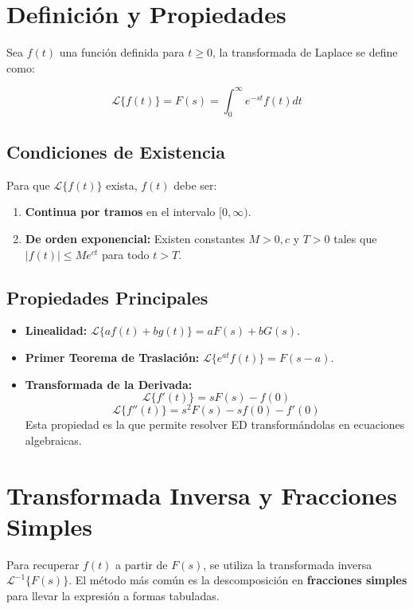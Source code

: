 \documentclass[a4paper,12pt]{article}
\begin{document}
 \section{Definición y Propiedades}
 Sea $f(t)$ una función definida para $t \geqslant 0$, la transformada de Laplace se define como:
 \begin{tcolorbox}[colback=red!5!white,colframe=red!75!black,title=Definición Integral]
 $$ \mathcal{L}\{f(t)\} = F(s) = \int_{0}^{\infty} e^{-st} f(t) dt $$
 \end{tcolorbox}

 \subsection{Condiciones de Existencia}
 Para que $\mathcal{L}\{f(t)\}$ exista, $f(t)$ debe ser:
 \begin{enumerate}
     \item \textbf{Continua por tramos} en el intervalo $[0, \infty)$.
     \item \textbf{De orden exponencial:} Existen constantes $M > 0, c$ y $T > 0$ tales que $|f(t)| \le Me^{ct}$ para todo $t > T$.
 \end{enumerate}

 \subsection{Propiedades Principales}
 \begin{itemize}
     \item \textbf{Linealidad:} $\mathcal{L}\{af(t) + bg(t)\} = aF(s) + bG(s)$.
     \item \textbf{Primer Teorema de Traslación:} $\mathcal{L}\{e^{at}f(t)\} = F(s-a)$.
     \item \textbf{Transformada de la Derivada:}
     $$ \mathcal{L}\{f'(t)\} = sF(s) - f(0) $$
     $$ \mathcal{L}\{f''(t)\} = s^2F(s) - sf(0) - f'(0) $$
     Esta propiedad es la que permite resolver ED transformándolas en ecuaciones algebraicas.
 \end{itemize}

 \newpage
 \section{Transformada Inversa y Fracciones Simples}
 Para recuperar $f(t)$ a partir de $F(s)$, se utiliza la transformada inversa $\mathcal{L}^{-1}\{F(s)\}$. El método más común es la descomposición en \textbf{fracciones simples} para llevar la expresión a formas tabuladas.
\end{document}
